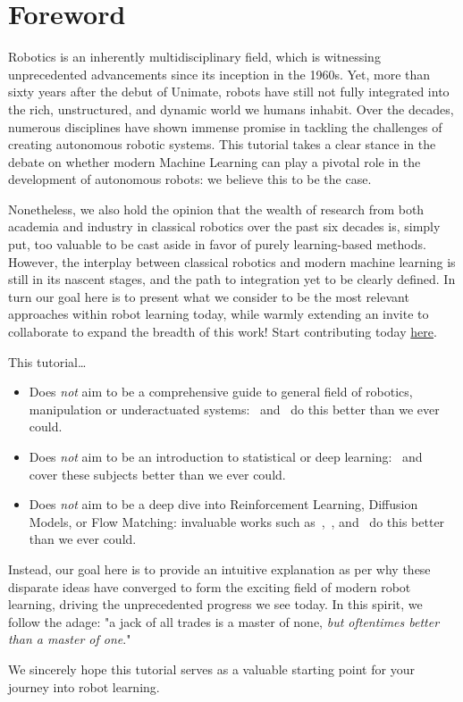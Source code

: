 \section*{Foreword}

Robotics is an inherently multidisciplinary field, which is witnessing unprecedented advancements since its inception in the 1960s.
Yet, more than sixty years after the debut of Unimate, robots have still not fully integrated into the rich, unstructured, and dynamic world we humans inhabit.
Over the decades, numerous disciplines have shown immense promise in tackling the challenges of creating autonomous robotic systems.
This tutorial takes a clear stance in the debate on whether modern Machine 
Learning can play a pivotal role in the development of 
autonomous robots: we believe this to be the case.

Nonetheless, we also hold the opinion that the wealth of research from both academia and industry in classical robotics over the past six decades is, simply put, too valuable to be cast aside in favor of purely learning-based methods.
However, the interplay between classical robotics and modern machine learning is still in its nascent stages, and the path to integration yet to be clearly defined.
In turn our goal here is to present what we consider to be the most relevant approaches within robot learning today, while warmly extending an invite to collaborate to expand the breadth of this work! Start contributing today \href{https://github.com/fracapuano/robot-learning-tutorial}{here}.

This tutorial\dots
\begin{itemize}
    \item Does \emph{not} aim to be a comprehensive guide to general field of robotics, manipulation or underactuated systems:~\citet{sicilianoSpringerHandbookRobotics2016} and~\citet{tedrakeRoboticManipulationPerception,tedrakeUnderactuatedRoboticsAlgorithms} do this better than we ever could.
    \item Does \emph{not} aim to be an introduction to statistical or deep learning:~\citet{shalev-shwartzUnderstandingMachineLearning2014} and~\citet{prince2023understanding} cover these subjects better than we ever could.
    \item Does \emph{not} aim to be a deep dive into Reinforcement Learning, Diffusion Models, or Flow Matching: invaluable works such as~\citet{suttonReinforcementLearningIntroduction2018},~\citet{nakkiranStepbyStepDiffusionElementary2024}, and~\citet{lipmanFlowMatchingGuide2024} do this better than we ever could.
\end{itemize}

Instead, our goal here is to provide an intuitive explanation as per why these disparate ideas have converged to form the exciting field of modern robot learning, driving the unprecedented progress we see today. 
In this spirit, we follow the adage: "a jack of all trades is a master of none, \emph{but oftentimes better than a master of one}."

We sincerely hope this tutorial serves as a valuable starting point for your journey into robot learning.